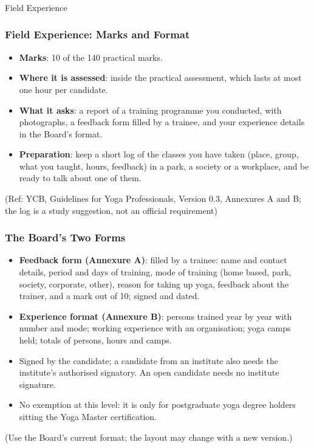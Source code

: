 \begin{frame}[fragile]\frametitle{}
\begin{center}
{\Large Field Experience }
\end{center}
\end{frame}

\begin{frame}[fragile]\frametitle{Field Experience: Marks and Format}
\begin{itemize}
\item \textbf{Marks}: 10 of the 140 practical marks.
\item \textbf{Where it is assessed}: inside the practical assessment, which lasts at most one hour per candidate.
\item \textbf{What it asks}: a report of a training programme you conducted, with photographs, a feedback form filled by a trainee, and your experience details in the Board's format.
\item \textbf{Preparation}: keep a short log of the classes you have taken (place, group, what you taught, hours, feedback) in a park, a society or a workplace, and be ready to talk about one of them.
\end{itemize}
{\tiny (Ref: YCB, Guidelines for Yoga Professionals, Version 0.3, Annexures A and B; the log is a study suggestion, not an official requirement)}
\end{frame}

\begin{frame}[fragile]\frametitle{The Board's Two Forms}
\begin{itemize}
\item \textbf{Feedback form (Annexure A)}: filled by a trainee: name and contact details, period and days of training, mode of training (home based, park, society, corporate, other), reason for taking up yoga, feedback about the trainer, and a mark out of 10; signed and dated.
\item \textbf{Experience format (Annexure B)}: persons trained year by year with number and mode; working experience with an organisation; yoga camps held; totals of persons, hours and camps.
\item Signed by the candidate; a candidate from an institute also needs the institute's authorised signatory. An open candidate needs no institute signature.
\item No exemption at this level: it is only for postgraduate yoga degree holders sitting the Yoga Master certification.
\end{itemize}
{\tiny (Use the Board's current format; the layout may change with a new version.)}
\end{frame}

